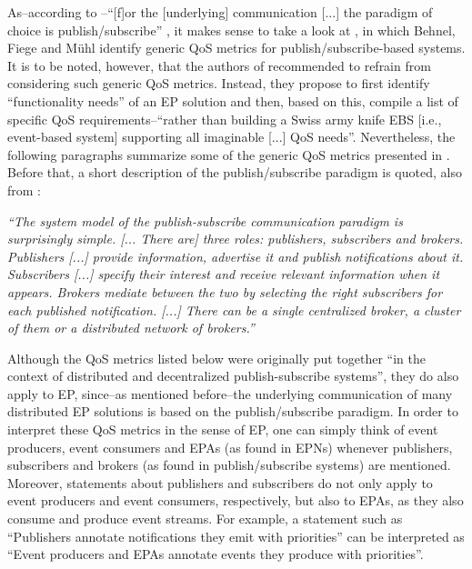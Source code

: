 \documentclass[article, type=bsc, colorback, accentcolor=tud8b, parskip=half, bibliography=totocnumbered]{tudthesis}
\begin{document}
As--according to \cite{quality}--``[f]or the [underlying] communication [...] the paradigm of choice is publish/subscribe'' \cite{quality}, it makes sense to take a look at \cite{1648910}, in which Behnel, Fiege and Mühl identify generic QoS metrics for publish/subscribe-based systems.
It is to be noted, however, that the authors of \cite{quality} recommended to refrain from considering such generic QoS metrics.
Instead, they propose to first identify ``functionality needs'' of an EP solution and then, based on this, compile a list of specific QoS requirements--``rather than building a Swiss army knife EBS [i.e., event-based system] supporting all imaginable [...] QoS needs''.
Nevertheless, the following paragraphs summarize some of the generic QoS metrics presented in \cite{1648910}. 
Before that, a short description of the publish/subscribe paradigm is quoted, also from \cite{1648910}:

\emph{
``The system model of the publish-subscribe communication paradigm is surprisingly simple.
[... There are] three roles: publishers, subscribers and brokers.
Publishers [...] provide information, advertise it and publish notifications about it.
Subscribers [...] specify their interest and receive relevant information when it appears.
Brokers mediate between the two by selecting the right subscribers for each published notification. [...]
There can be a single centralized broker, a cluster of them or a distributed network of brokers.''}

Although the QoS metrics listed below were originally put together ``in the context of distributed and decentralized publish-subscribe systems'', they do also apply to EP, since--as mentioned before--the underlying communication of many distributed EP solutions is based on the publish/subscribe paradigm.
In order to interpret these QoS metrics in the sense of EP, one can simply think of event producers, event consumers and EPAs (as found in EPNs) whenever publishers, subscribers and brokers (as found in publish/subscribe systems) are mentioned.
Moreover, statements about publishers and subscribers do not only apply to event producers and event consumers, respectively, but also to EPAs, as they also consume and produce event streams.
For example, a statement such as ``Publishers annotate notifications they emit with priorities'' can be interpreted as ``Event producers and EPAs annotate events they produce with priorities''.
\end{document}
